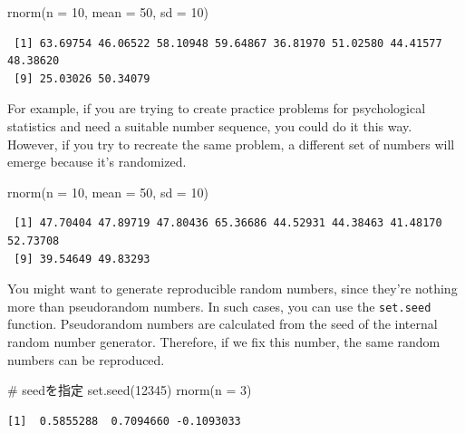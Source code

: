 \documentclass[
  a4paper,
]{book}
\newenvironment{Shaded}{\begin{snugshade}}{\end{snugshade}}
\newcommand{\AttributeTok}[1]{\textcolor[rgb]{0.40,0.45,0.13}{#1}}
\newcommand{\CommentTok}[1]{\textcolor[rgb]{0.37,0.37,0.37}{#1}}
\newcommand{\DecValTok}[1]{\textcolor[rgb]{0.68,0.00,0.00}{#1}}
\newcommand{\FunctionTok}[1]{\textcolor[rgb]{0.28,0.35,0.67}{#1}}
\newcommand{\NormalTok}[1]{\textcolor[rgb]{0.00,0.23,0.31}{#1}}
\begin{document}
\begin{Shaded}
\begin{Highlighting}[]
\FunctionTok{rnorm}\NormalTok{(}\AttributeTok{n =} \DecValTok{10}\NormalTok{, }\AttributeTok{mean =} \DecValTok{50}\NormalTok{, }\AttributeTok{sd =} \DecValTok{10}\NormalTok{)}
\end{Highlighting}
\end{Shaded}

\begin{verbatim}
 [1] 63.69754 46.06522 58.10948 59.64867 36.81970 51.02580 44.41577 48.38620
 [9] 25.03026 50.34079
\end{verbatim}

For example, if you are trying to create practice problems for
psychological statistics and need a suitable number sequence, you could
do it this way. However, if you try to recreate the same problem, a
different set of numbers will emerge because it's randomized.

\begin{Shaded}
\begin{Highlighting}[]
\FunctionTok{rnorm}\NormalTok{(}\AttributeTok{n =} \DecValTok{10}\NormalTok{, }\AttributeTok{mean =} \DecValTok{50}\NormalTok{, }\AttributeTok{sd =} \DecValTok{10}\NormalTok{)}
\end{Highlighting}
\end{Shaded}

\begin{verbatim}
 [1] 47.70404 47.89719 47.80436 65.36686 44.52931 44.38463 41.48170 52.73708
 [9] 39.54649 49.83293
\end{verbatim}

You might want to generate reproducible random numbers, since they're
nothing more than pseudorandom numbers. In such cases, you can use the
\texttt{set.seed} function. Pseudorandom numbers are calculated from the
seed of the internal random number generator. Therefore, if we fix this
number, the same random numbers can be reproduced.

\begin{Shaded}
\begin{Highlighting}[]
\CommentTok{\# seedを指定}
\FunctionTok{set.seed}\NormalTok{(}\DecValTok{12345}\NormalTok{)}
\FunctionTok{rnorm}\NormalTok{(}\AttributeTok{n =} \DecValTok{3}\NormalTok{)}
\end{Highlighting}
\end{Shaded}

\begin{verbatim}
[1]  0.5855288  0.7094660 -0.1093033
\end{verbatim}
\end{document}
